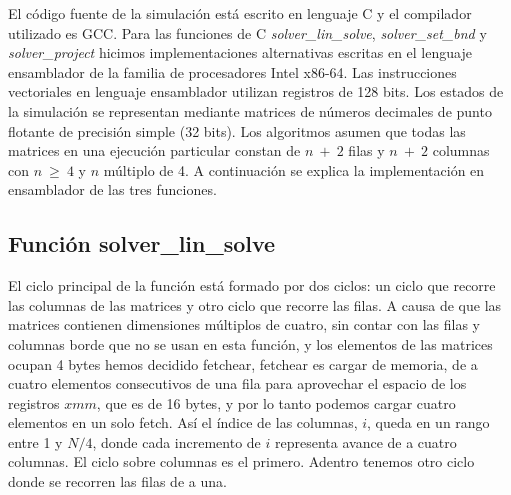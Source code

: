 El código fuente de la simulación está escrito en lenguaje C y el compilador utilizado es GCC. Para las funciones de C \textit{solver\_lin\_solve}, \textit{solver\_set\_bnd} y \textit{solver\_project} hicimos implementaciones alternativas escritas en el lenguaje ensamblador de la familia de procesadores Intel x86-64. Las instrucciones vectoriales en lenguaje ensamblador utilizan registros de 128 bits. Los estados de la simulación se representan mediante matrices de números decimales de punto flotante de precisión simple (32 bits). Los algoritmos asumen que todas las matrices en una ejecución particular constan de $n\ +\ 2$ filas y $n\ +\ 2$ columnas con $n\ \geq\ 4$ y $n$ múltiplo de 4. A continuación se explica la implementación en ensamblador de las tres funciones.
\subsection{Función solver\_lin\_solve}
\par El ciclo principal de la función está formado por dos ciclos: un ciclo que recorre las columnas de las matrices y otro ciclo que recorre las filas. A causa de que las matrices contienen dimensiones múltiplos de 
cuatro, sin contar con las filas y columnas borde que no se usan en esta función, y los elementos
de las matrices ocupan 4 bytes hemos decidido fetchear, fetchear es cargar de memoria, de a cuatro elementos consecutivos de una fila para aprovechar el espacio de los registros $xmm$, que es
de 16 bytes, y por lo tanto podemos cargar cuatro elementos en un solo fetch. Así el índice de
las columnas, $i$, queda en un rango entre 1 y $N/4$, donde cada incremento de $i$ representa avance de a cuatro columnas. El ciclo sobre columnas es el primero.  
Adentro tenemos otro ciclo donde se recorren las filas de a una. \newline

